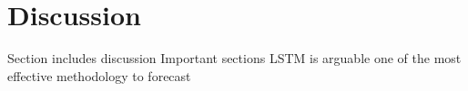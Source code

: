 \section{Discussion}
Section includes discussion
Important sections
LSTM is arguable one of the most effective methodology to forecast 